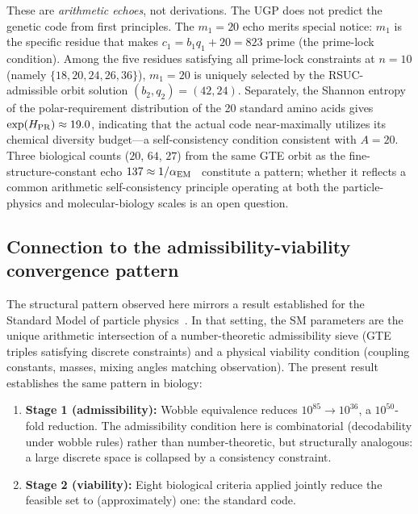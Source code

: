 \documentclass[10pt,twocolumn]{article}
\begin{document}
\medskip
\noindent
These are \emph{arithmetic echoes}, not derivations. The UGP does not predict
the genetic code from first principles. The $m_1=20$ echo merits special
notice: $m_1$ is the specific residue that makes $c_1 = b_1 q_1 + 20 = 823$
prime (the prime-lock condition). Among the five residues satisfying all
prime-lock constraints at $n=10$ (namely $\{18,20,24,26,36\}$), $m_1=20$
is uniquely selected by the RSUC-admissible orbit solution
$(b_2,q_2)=(42,24)$. Separately, the Shannon entropy of the polar-requirement
distribution of the 20 standard amino acids gives $\exp(H_{\rm PR}) \approx 19.0$,
indicating that the actual code near-maximally utilizes its chemical diversity
budget---a self-consistency condition consistent with $A=20$. Three biological
counts ($20$, $64$, $27$) from the same GTE orbit as the fine-structure-constant
echo $137 \approx 1/\alpha_{\rm EM}$~\cite{SpivackUGP,ugp-lean} constitute
a pattern; whether it reflects a common arithmetic self-consistency principle
operating at both the particle-physics and molecular-biology scales is an open
question.

\subsection{Connection to the admissibility-viability convergence pattern}

The structural pattern observed here mirrors a result established for the
Standard Model of particle physics~\cite{SpivackP24}. In that setting, the SM
parameters are the unique arithmetic intersection of a number-theoretic admissibility
sieve (GTE triples satisfying discrete constraints) and a physical viability
condition (coupling constants, masses, mixing angles matching observation). The
present result establishes the same pattern in biology:

\begin{enumerate}[leftmargin=1.5em,itemsep=0pt]
\item \textbf{Stage 1 (admissibility):} Wobble equivalence reduces $10^{85} \to
  10^{36}$, a $10^{50}$-fold reduction. The admissibility condition here is
  combinatorial (decodability under wobble rules) rather than number-theoretic,
  but structurally analogous: a large discrete space is collapsed by a consistency constraint.
\item \textbf{Stage 2 (viability):} Eight biological criteria applied jointly
  reduce the feasible set to (approximately) one: the standard code.
\end{enumerate}
\end{document}
